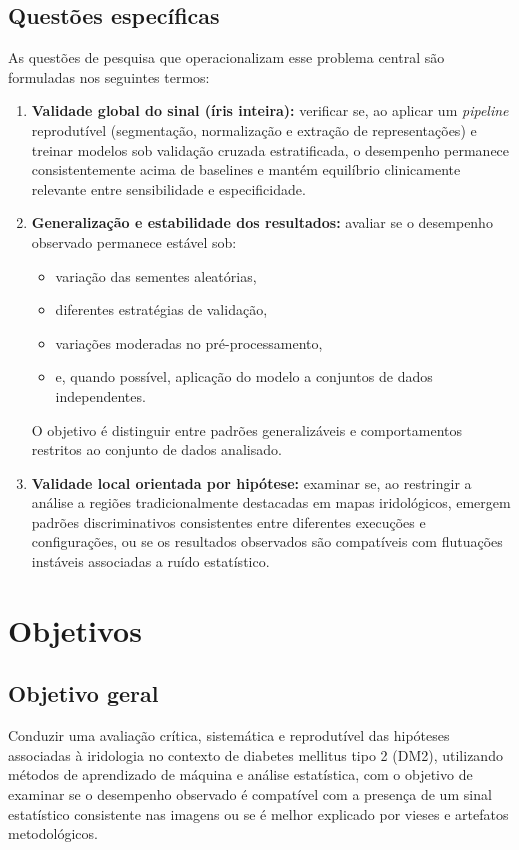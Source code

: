 \documentclass[11pt,a4paper]{article}
\begin{document}
\subsection{Questões específicas}
As questões de pesquisa que operacionalizam esse problema central são formuladas nos seguintes termos:

\begin{enumerate}
    \item \textbf{Validade global do sinal (íris inteira):} verificar se, ao aplicar um \textit{pipeline} reprodutível (segmentação, normalização e extração de representações) e treinar modelos sob validação cruzada estratificada, o desempenho permanece consistentemente acima de baselines e mantém equilíbrio clinicamente relevante entre sensibilidade e especificidade.

    \item \textbf{Generalização e estabilidade dos resultados:} avaliar se o desempenho observado permanece estável sob:
    \begin{itemize}
        \item variação das sementes aleatórias,
        \item diferentes estratégias de validação,
        \item variações moderadas no pré-processamento,
        \item e, quando possível, aplicação do modelo a conjuntos de dados independentes.
    \end{itemize}
    O objetivo é distinguir entre padrões generalizáveis e comportamentos restritos ao conjunto de dados analisado.

    \item \textbf{Validade local orientada por hipótese:} examinar se, ao restringir a análise a regiões tradicionalmente destacadas em mapas iridológicos, emergem padrões discriminativos consistentes entre diferentes execuções e configurações, ou se os resultados observados são compatíveis com flutuações instáveis associadas a ruído estatístico.
\end{enumerate}

\section{Objetivos}

\subsection{Objetivo geral}
Conduzir uma avaliação crítica, sistemática e reprodutível das hipóteses associadas à iridologia no contexto de diabetes mellitus tipo 2 (DM2), utilizando métodos de aprendizado de máquina e análise estatística, com o objetivo de examinar se o desempenho observado é compatível com a presença de um sinal estatístico consistente nas imagens ou se é melhor explicado por vieses e artefatos metodológicos.
\end{document}
